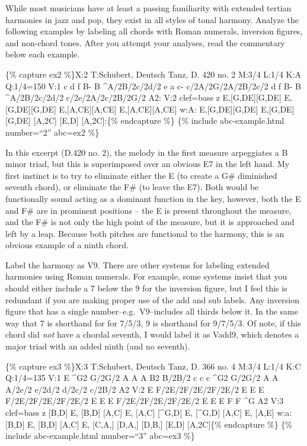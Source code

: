 \documentclass{book}
\begin{document}
While most musicians have at least a passing familiarity with extended tertian
harmonies in jazz and pop, they exist in all styles of tonal harmony. Analyze
the following examples by labeling all chords with Roman numerals, inversion
figures, and non-chord tones. After you attempt your analyses, read the
commentary below each example.

\{\% capture ex2 \%\}X:2 T:Schubert, Deutsch Tanz, D. 420 no. 2 M:3/4 L:1/4
K:A Q:1/4=150 V:1 c\textbar{} d f B-\textbar{} B \^{}A/2B/2c/2d/2\textbar{} e
a c-\textbar{} c/2A/2G/2A/2B/2c/2\textbar{} d f B-\textbar{} B
\^{}A/2B/2c/2d/2\textbar{} c/2e/2A/2c/2B/2G/2\textbar{} A2:\textbar{]} V:2
clef=bass z\textbar{} E,{[}G,DE{]}{[}G,DE{]}\textbar{}
E,{[}G,DE{]}{[}G,DE{]}\textbar{} E,{[}A,CE{]}{[}A,CE{]}\textbar{}
E,{[}A,CE{]}{[}A,CE{]}\textbar{} w:A: E,{[}G,DE{]}{[}G,DE{]}\textbar{}
E,{[}G,DE{]}{[}G,DE{]}\textbar{} {[}A,2C{]} {[}E,D{]}\textbar{}
{[}A,2C{]}:\textbar{]}\{\% endcapture \%\} \{\% include abc-example.html
number=``2'' abc=ex2 \%\}

In this excerpt (D.420 no. 2), the melody in the first measure arpeggiates a B
minor triad, but this is superimposed over an obvious E7 in the left hand. My
first instinct is to try to eliminate either the E (to create a G\# diminished
seventh chord), or eliminate the F\# (to leave the E7). Both would be
functionally sound acting as a dominant function in the key, however, both the
E and F\# are in prominent positions -- the E is present throughout the
measure, and the F\# is not only the high point of the measure, but it is
approached and left by a leap. Because both pitches are functional to the
harmony, this is an obvious example of a ninth chord.

Label the harmony as V9. There are other systems for labeling extended
harmonies using Roman numerals. For example, some systems insist that you
should either include a 7 below the 9 for the inversion figure, but I feel
this is redundant if you are making proper use of the add and sub labels. Any
inversion figure that has a single number--e.g.~V9--includes all thirds below
it. In the same way that 7 is shorthand for for 7/5/3, 9 is shorthand for
9/7/5/3. Of note, if this chord did \emph{not} have a chordal seventh, I would
label it as Vadd9, which denotes a major triad with an added ninth (and no
seventh).

\{\% capture ex3 \%\}X:3 T:Schubert, Deutsch Tanz, D. 366 no. 4 M:3/4 L:1/4
K:C Q:1/4=135 V:1 E\textbar{} \^{}G2 G/2G/2\textbar{} A A A\textbar{} B2
B/2B/2\textbar{} c c c\textbar{} \^{}G2 G/2G/2\textbar{} A A A/2e/2\textbar{}
e/2d/2 d/2c/2 c/2B/2\textbar{} A2\textbar{]} V:2 E\textbar{}
F/2E/2F/2E/2F/2E/2\textbar{} E E E\textbar{} F/2E/2F/2E/2F/2E/2\textbar{} E E
E\textbar{} F/2E/2F/2E/2F/2E/2\textbar{} E E E\textbar{} F F \^{}G\textbar{}
A2\textbar{]} V:3 clef=bass z\textbar{} {[}B,D{]} E, {[}B,D{]}\textbar{}
{[}A,C{]} E, {[}A,C{]}\textbar{} {[}\^{}G,D{]} E, {[}\^{}G,D{]}\textbar{}
{[}A,C{]} E, {[}A,E{]}\textbar{} w:a: {[}B,D{]} E, {[}B,D{]}\textbar{}
{[}A,C{]} E, {[}C,A,{]}\textbar{} {[}D,A,{]} {[}D,B,{]} {[}E,D{]}\textbar{}
{[}A,2C{]}\textbar{]}\{\% endcapture \%\} \{\% include abc-example.html
number=``3'' abc=ex3 \%\}
\end{document}
